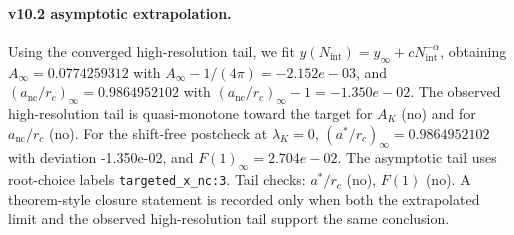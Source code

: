 \paragraph{v10.2 asymptotic extrapolation.}
Using the converged high-resolution tail, we fit $y(N_{\mathrm{int}})=y_{\infty}+cN_{\mathrm{int}}^{-\alpha}$, obtaining $A_\infty=0.0774259312$ with $A_\infty-1/(4\pi)=-2.152e-03$, and $(a_{\mathrm{nc}}/r_c)_\infty=0.9864952102$ with $(a_{\mathrm{nc}}/r_c)_\infty-1=-1.350e-02$. The observed high-resolution tail is quasi-monotone toward the target for $A_K$ (no) and for $a_{\mathrm{nc}}/r_c$ (no). For the shift-free postcheck at $\lambda_K=0$, $(a^*/r_c)_\infty=0.9864952102$ with deviation -1.350e-02, and $F(1)_\infty=2.704e-02$. The asymptotic tail uses root-choice labels \texttt{targeted_x_nc:3}. Tail checks: $a^*/r_c$ (no), $F(1)$ (no). A theorem-style closure statement is recorded only when both the extrapolated limit and the
observed high-resolution tail support the same conclusion.
